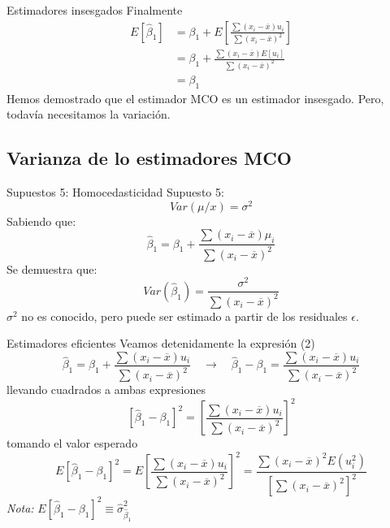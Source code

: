 \begin{frame}{Estimadores insesgados}
	Finalmente
	\begin{align*}
		E[\widehat{\beta}_1] & = \beta_1 + E\left[\frac{\sum (x_{i}-\overline{x})u_i}{\sum (x_{i}-\overline{x})^2}\right]\\
		& = \beta_1 + \frac{\sum (x_{i}-\overline{x})E[u_i]}{\sum (x_{i}-\overline{x})^2}\\
		& = \beta_1
	\end{align*}
	Hemos demostrado que el estimador MCO es un estimador insesgado. Pero, todavía necesitamos la variación.
\end{frame}

\subsection{Varianza de lo estimadores MCO}
\begin{frame}{Supuestos 5: Homocedasticidad}
	Supuesto 5:
	$$Var(\mu / x) = \sigma^{2}$$
	Sabiendo que:
	$$\hat{\beta}_{1} = \beta_{1} + \frac{\sum (x_{i}-\overline{x})\mu_{i}}{\sum (x_{i}-\overline{x})^2}$$
	Se demuestra que:
	$$Var(\hat{\beta}_{1})=\frac{\sigma^{2}}{\sum (x_{i}-\overline{x})^2}$$
	$\sigma^{2}$ no es conocido, pero puede ser estimado a partir de los residuales $\epsilon$.
\end{frame}
\begin{frame}{Estimadores eficientes}
	Veamos detenidamente la expresión (2)
	$$\widehat{\beta}_1 = \beta_1 + \frac{\sum (x_{i}-\overline{x})u_i}{\sum (x_{i}-\overline{x})^2} \quad \rightarrow \quad \widehat{\beta}_1 - \beta_1 = \frac{\sum (x_{i}-\overline{x})u_i}{\sum (x_{i}-\overline{x})^2} $$
	llevando cuadrados a ambas expresiones
	$$\left[ \widehat{\beta}_1 - \beta_1\right]^2 = \left[\frac{\sum (x_{i}-\overline{x})u_i}{\sum (x_{i}-\overline{x})^2}\right]^2 $$
	tomando el valor esperado
	$$E\left[ \widehat{\beta}_1 - \beta_1\right]^2 = E\left[\frac{\sum (x_{i}-\overline{x})u_i}{\sum (x_{i}-\overline{x})^2}\right]^2 = \frac{\sum (x_{i}-\overline{x})^2E(u_i^2)}{\left[\sum (x_{i}-\overline{x})^2\right]^2}$$
	\textit{Nota:} $E\left[ \widehat{\beta}_1 - \beta_1\right]^2 \equiv \widehat{\sigma}_{\widehat{\beta}_1}^{2}$
\end{frame}
